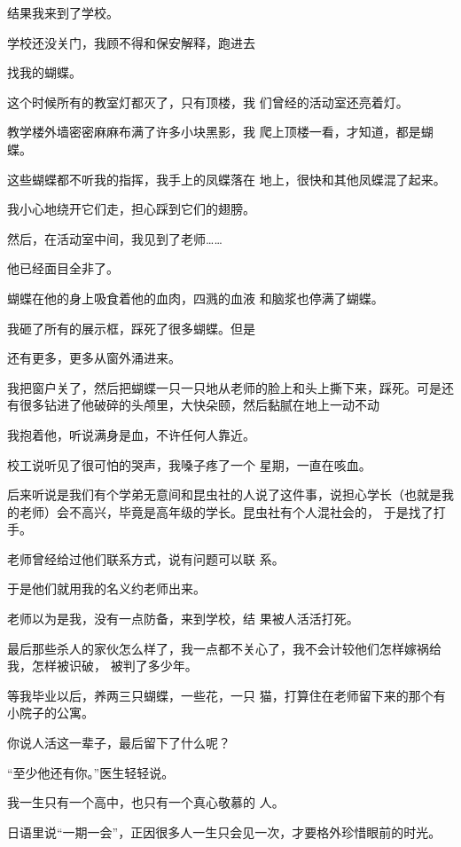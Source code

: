 \documentclass{article}
\begin{document}
结果我来到了学校。 

学校还没关门，我顾不得和保安解释，跑进去
\newpage

找我的蝴蝶。 

这个时候所有的教室灯都灭了，只有顶楼，我
们曾经的活动室还亮着灯。 

教学楼外墙密密麻麻布满了许多小块黑影，我
爬上顶楼一看，才知道，都是蝴蝶。 

这些蝴蝶都不听我的指挥，我手上的凤蝶落在
地上，很快和其他凤蝶混了起来。 

我小心地绕开它们走，担心踩到它们的翅膀。


然后，在活动室中间，我见到了老师…… 


他已经面目全非了。 

蝴蝶在他的身上吸食着他的血肉，四溅的血液
和脑浆也停满了蝴蝶。 

我砸了所有的展示框，踩死了很多蝴蝶。但是
\newpage

还有更多，更多从窗外涌进来。 

我把窗户关了，然后把蝴蝶一只一只地从老师的脸上和头上撕下来，踩死。可是还有很多钻进了他破碎的头颅里，大快朵颐，然后黏腻在地上一动不动

我抱着他，听说满身是血，不许任何人靠近。

校工说听见了很可怕的哭声，我嗓子疼了一个
星期，一直在咳血。 

后来听说是我们有个学弟无意间和昆虫社的人说了这件事，说担心学长（也就是我的老师）会不高兴，毕竟是高年级的学长。昆虫社有个人混社会的，
于是找了打手。 

老师曾经给过他们联系方式，说有问题可以联
系。 


于是他们就用我的名义约老师出来。 

\newpage

老师以为是我，没有一点防备，来到学校，结
果被人活活打死。 

最后那些杀人的家伙怎么样了，我一点都不关心了，我不会计较他们怎样嫁祸给我，怎样被识破，
被判了多少年。 

等我毕业以后，养两三只蝴蝶，一些花，一只
猫，打算住在老师留下来的那个有小院子的公寓。 


你说人活这一辈子，最后留下了什么呢？ 


“至少他还有你。”医生轻轻说。 

我一生只有一个高中，也只有一个真心敬慕的
人。 

日语里说“一期一会”，正因很多人一生只会见一次，才要格外珍惜眼前的时光。
\end{document}
